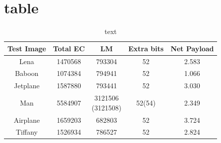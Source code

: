 \section{table}

\begin{table}
	\centering
	\caption{text}
	\begin{tabular}{|c|c|c|c|c|} \hline
		Test Image & Total EC & LM                & Extra bits & Net Payload \\ \hline
		Lena       & 1470568  & 793304            & 52         & 2.583       \\ 
		Baboon     & 1074384  & 794941            & 52         & 1.066       \\
		Jetplane   & 1587880  & 793441            & 52         & 3.030       \\
		Man        & 5584907  & \makecell{3121506                            \\(3121508)}&52(54)& 2.349\\
		Airplane   & 1659203  & 682803            & 52         & 3.724       \\
		Tiffany    & 1526934  & 786527            & 52         & 2.824       \\
	\end{tabular}
\end{table}

